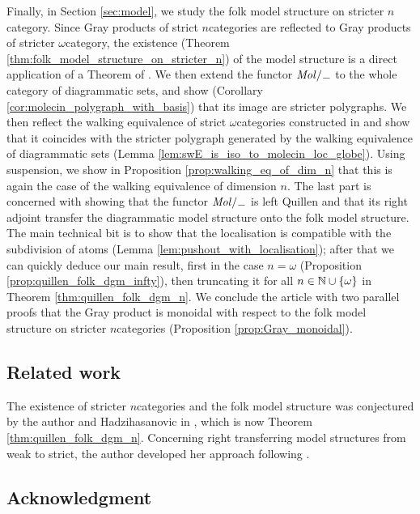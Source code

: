 Finally, in Section \ref{sec:model}, we study the folk model structure on stricter \( n \)\nbd category. 
Since Gray products of strict \( n \)\nbd categories are reflected to Gray products of stricter \( \omega \)\nbd category, the existence (Theorem \ref{thm:folk_model_structure_on_stricter_n}) of the model structure is a direct application of a Theorem of \cite{ara2025polygraphs}.
We then extend the functor \( \molecin{-} \) to the whole category of diagrammatic sets, and show (Corollary \ref{cor:molecin_polygraph_with_basis}) that its image are stricter polygraphs. 
We then reflect the walking equivalence of strict \( \omega \)\nbd categories constructed in \cite{hadzihasanovic2024model} and show that it coincides with the stricter polygraph generated by the walking equivalence of diagrammatic sets (Lemma \ref{lem:swE_is_iso_to_molecin_loc_globe}).
Using suspension, we show in Proposition \ref{prop:walking_eq_of_dim_n} that this is again the case of the walking equivalence of dimension \( n \).
The last part is concerned with showing that the functor \( \molecin{-} \) is left Quillen and that its right adjoint transfer the diagrammatic model structure onto the folk model structure.
The main technical bit is to show that the localisation is compatible with the subdivision of atoms (Lemma \ref{lem:pushout_with_localisation}); after that we can quickly deduce our main result, first in the case \( n = \omega \) (Proposition \ref{prop:quillen_folk_dgm_infty}), then truncating it for all \( n \in \mathbb{N} \cup \left\{ {\omega} \right\} \) in Theorem \ref{thm:quillen_folk_dgm_n}.  
We conclude the article with two parallel proofs that the Gray product is monoidal with respect to the folk model structure on stricter \( n \)\nbd categories (Proposition \ref{prop:Gray_monoidal}).

\subsection*{Related work}

The existence of stricter \( n \)\nbd categories and the folk model structure was conjectured by the author and Hadzihasanovic in \cite[Conjecture 6.3]{chanavat2024model}, which is now Theorem \ref{thm:quillen_folk_dgm_n}.
Concerning right transferring model structures from weak to strict, the author developed her approach following \cite{ozornova2021nerves}.

\subsection*{Acknowledgment}

